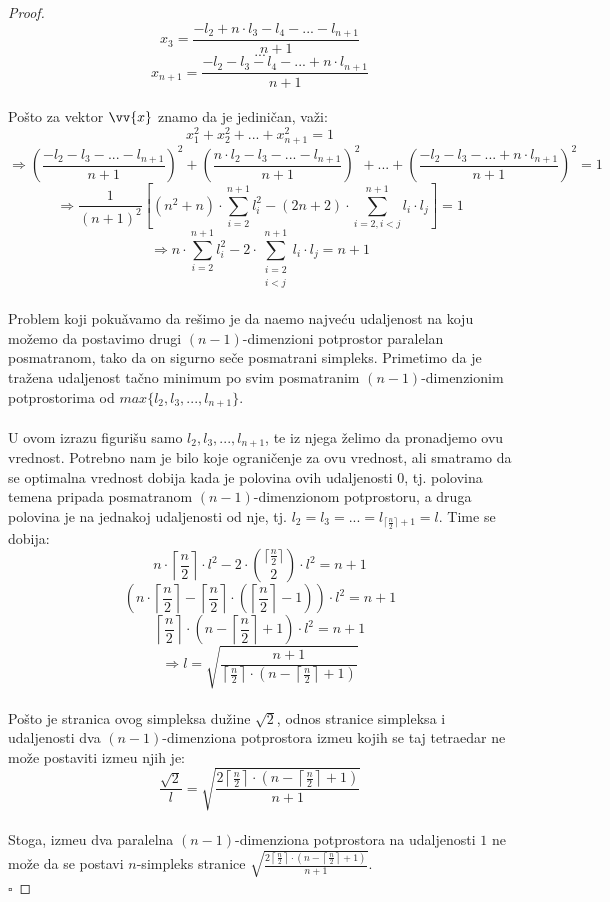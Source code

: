 \documentclass[11pt,letter]{article}
\begin{document}
\begin{proof}
$$x_3=\frac{-l_2+n\cdot l_3-l_4-...-l_{n+1}}{n+1}$$
$$...$$
$$x_{n+1}=\frac{-l_2-l_3-l_4-...+n\cdot l_{n+1}}{n+1}$$
\\
\indent Po\v sto za vektor $\vv{x}$ znamo da je jedini\v can, va\v zi:
$$x_1^2+ x_2^2+...+x_{n+1}^2=1$$
$$\Rightarrow \left(\frac{-l_2-l_3-...-l_{n+1}}{n+1}\right)^2+\left(\frac{n\cdot l_2-l_3-...-l_{n+1}}{n+1}\right)^2+...+\left(\frac{-l_2-l_3-...+n\cdot l_{n+1}}{n+1}\right)^2=1$$
$$\Rightarrow \frac{1}{(n+1)^2}\left[ (n^2+n)\cdot {\sum_{i=2}^{n+1} {l_i^2}} - (2n+2)\cdot {\sum_{i=2, i<j}^{n+1} {l_i\cdot l_j} } \right]=1$$
$$\Rightarrow n\cdot {\sum_{i=2}^{n+1} {l_i^2}} - 2\cdot {\sum_{\substack{ i=2\\ i<j}}^{n+1} {l_i\cdot l_j} } =n+1$$
\\
\indent Problem koji poku\v avamo da re\v simo je da na\dj emo najve\' cu udaljenost na koju mo\v zemo da postavimo drugi $(n-1)$-dimenzioni potprostor paralelan posmatranom, tako da on sigurno se\v ce posmatrani simpleks. Primetimo da je tra\v zena udaljenost ta\v cno minimum po svim posmatranim $(n-1)$-dimenzionim potprostorima od $max\{l_2, l_3,..., l_{n+1}\}$.
\\
\\
\indent U ovom izrazu figuri\v su samo $l_2, l_3,..., l_{n+1}$, te iz njega \v zelimo da pronadjemo ovu vrednost. Potrebno nam je bilo koje ograni\v cenje za ovu vrednost, ali smatramo da se optimalna vrednost dobija kada je polovina ovih udaljenosti 0, tj. polovina temena pripada posmatranom $(n-1)$-dimenzionom potprostoru, a druga polovina je na jednakoj udaljenosti od nje, tj. $l_2=l_3=...=l_{\lceil \frac{n}{2}\rceil+1}=l$. Time se dobija:
$$n\cdot \left \lceil{\frac{n}{2}}\right \rceil\cdot l^2-2\cdot {{\lceil{\frac{n}{2}}\rceil}\choose {2}}\cdot l^2=n+1$$
$$\left( n\cdot \left \lceil \frac{n}{2} \right \rceil - {\left \lceil \frac{n}{2} \right\rceil} \cdot \left( \left \lceil \frac{n}{2}\right \rceil -1 \right) \right) \cdot l^2=n+1$$
$$\left \lceil \frac{n}{2} \right \rceil \cdot \left( n-\left \lceil \frac{n}{2}\right \rceil +1 \right)\cdot l^2=n+1$$
$$\Rightarrow l=\sqrt{\frac{n+1}{\left\lceil \frac{n}{2}\right\rceil \cdot \left( n-\left\lceil \frac{n}{2}\right\rceil+1\right)}}$$
\\
Po\v sto je stranica ovog simpleksa du\v zine $\sqrt2$, odnos stranice simpleksa i udaljenosti dva $(n-1)$-dimenziona potprostora izme\dj u  kojih se taj tetraedar ne mo\v ze postaviti izme\dj u njih je:
$$\frac{\sqrt2}{l}=\sqrt{\frac{2\left\lceil \frac{n}{2}\right\rceil\cdot \left( n-\left\lceil\frac{n}{2}\right\rceil+1\right)}{n+1}}$$
\\
Stoga, izme\dj u dva paralelna $(n-1)$-dimenziona potprostora na udaljenosti $1$ ne mo\v ze da se postavi $n$-simpleks stranice  $\sqrt{\frac{2\left\lceil \frac{n}{2}\right\rceil\cdot \left( n-\left\lceil\frac{n}{2}\right\rceil+1\right)}{n+1}}$.
\\
$\square$
\end{proof}
\\
\end{document}
